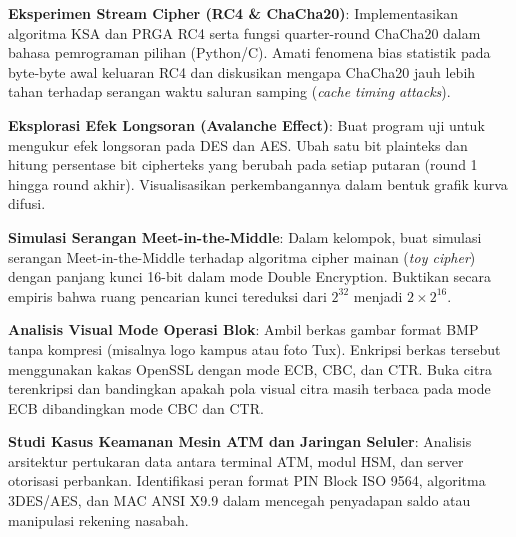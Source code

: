 \documentclass[main.tex]{subfiles}
\begin{document}

\begin{aktivitas}
  \item \textbf{Eksperimen Stream Cipher (RC4 \& ChaCha20)}: Implementasikan algoritma KSA dan PRGA RC4 serta fungsi quarter-round ChaCha20 dalam bahasa pemrograman pilihan (Python/C). Amati fenomena bias statistik pada byte-byte awal keluaran RC4 dan diskusikan mengapa ChaCha20 jauh lebih tahan terhadap serangan waktu saluran samping (\textit{cache timing attacks}).
  \item \textbf{Eksplorasi Efek Longsoran (Avalanche Effect)}: Buat program uji untuk mengukur efek longsoran pada DES dan AES. Ubah satu bit plainteks dan hitung persentase bit cipherteks yang berubah pada setiap putaran (round 1 hingga round akhir). Visualisasikan perkembangannya dalam bentuk grafik kurva difusi.
  \item \textbf{Simulasi Serangan Meet-in-the-Middle}: Dalam kelompok, buat simulasi serangan Meet-in-the-Middle terhadap algoritma cipher mainan (\textit{toy cipher}) dengan panjang kunci 16-bit dalam mode Double Encryption. Buktikan secara empiris bahwa ruang pencarian kunci tereduksi dari $2^{32}$ menjadi $2 \times 2^{16}$.
  \item \textbf{Analisis Visual Mode Operasi Blok}: Ambil berkas gambar format BMP tanpa kompresi (misalnya logo kampus atau foto Tux). Enkripsi berkas tersebut menggunakan kakas OpenSSL dengan mode ECB, CBC, dan CTR. Buka citra terenkripsi dan bandingkan apakah pola visual citra masih terbaca pada mode ECB dibandingkan mode CBC dan CTR.
  \item \textbf{Studi Kasus Keamanan Mesin ATM dan Jaringan Seluler}: Analisis arsitektur pertukaran data antara terminal ATM, modul HSM, dan server otorisasi perbankan. Identifikasi peran format PIN Block ISO 9564, algoritma 3DES/AES, dan MAC ANSI X9.9 dalam mencegah penyadapan saldo atau manipulasi rekening nasabah.
\end{aktivitas}

\end{document}
